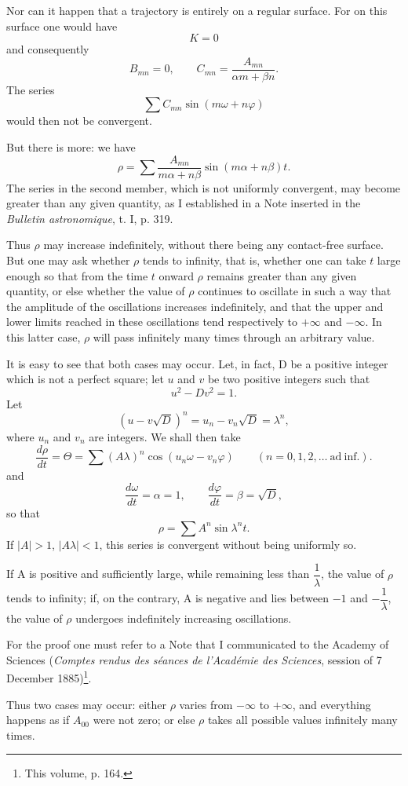 \documentclass[11pt]{article}
\begin{document}
Nor can it happen that a trajectory is entirely on a regular surface. For on this surface one would have
\[
K=0
\]
and consequently
\[
B_{mn}=0,
\qquad
C_{mn}=\frac{A_{mn}}{\alpha m+\beta n}.
\]
The series
\[
\sum C_{mn}\sin(m\omega+n\varphi)
\]
would then not be convergent.

But there is more: we have
\[
\rho=\sum \frac{A_{mn}}{m\alpha+n\beta}\sin(m\alpha+n\beta)t.
\]
The series in the second member, which is not uniformly convergent, may become greater than any given quantity, as I established in a Note inserted in the \emph{Bulletin astronomique}, t. I, p. 319.

Thus $\rho$ may increase indefinitely, without there being any contact-free surface. But one may ask whether $\rho$ tends to infinity, that is, whether one can take $t$ large enough so that from the time $t$ onward $\rho$ remains greater than any given quantity, or else whether the value of $\rho$ continues to oscillate in such a way that the amplitude of the oscillations increases indefinitely, and that the upper and lower limits reached in these oscillations tend respectively to $+\infty$ and $-\infty$. In this latter case, $\rho$ will pass infinitely many times through an arbitrary value.

It is easy to see that both cases may occur. Let, in fact, D be a positive integer which is not a perfect square; let $u$ and $v$ be two positive integers such that
\[
u^2-Dv^2=1.
\]
Let
\[
(u-v\sqrt{D})^n=u_n-v_n\sqrt{D}=\lambda^n,
\]
where $u_n$ and $v_n$ are integers. We shall then take
\[
\frac{d\rho}{dt}=\Theta=\sum(A\lambda)^n\cos(u_n\omega-v_n\varphi)
\qquad (n=0,1,2,\ldots\ \mathrm{ad\ inf.}).
\]
and
\[
\frac{d\omega}{dt}=\alpha=1,
\qquad
\frac{d\varphi}{dt}=\beta=\sqrt{D},
\]
so that
\[
\rho=\sum A^n\sin\lambda^nt.
\]
If $|A|>1$, $|A\lambda|<1$, this series is convergent without being uniformly so.

If A is positive and sufficiently large, while remaining less than $\dfrac1\lambda$, the value of $\rho$ tends to infinity; if, on the contrary, A is negative and lies between $-1$ and $-\dfrac1\lambda$, the value of $\rho$ undergoes indefinitely increasing oscillations.

For the proof one must refer to a Note that I communicated to the Academy of Sciences (\emph{Comptes rendus des séances de l’Académie des Sciences}, session of 7 December 1885)\footnote{This volume, p. 164.}.

Thus two cases may occur: either $\rho$ varies from $-\infty$ to $+\infty$, and everything happens as if $A_{00}$ were not zero; or else $\rho$ takes all possible values infinitely many times.
\end{document}
